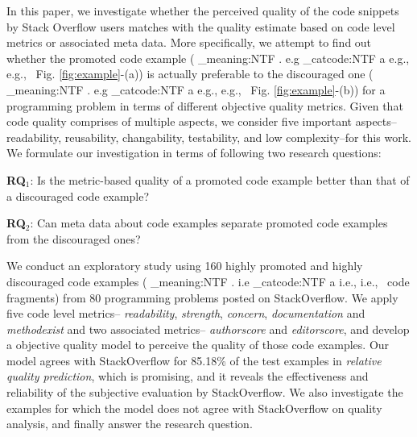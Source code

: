 \documentclass[conference]{IEEEtran}
\makeatletter
\newcommand\latinabbrev[1]{
  \peek_meaning:NTF . {%
    #1\@}%
  { \peek_catcode:NTF a {%
      #1., \@ }%
    {#1., \@}}}
\def\eg{\latinabbrev{e.g}}
\def\ie{\latinabbrev{i.e}}
\makeatother
\begin{document}
In this paper, we investigate whether the perceived quality of the code snippets by Stack Overflow users matches with the quality estimate based on code level metrics or associated meta data.
More specifically, we attempt to find out whether the promoted code example (\eg\ Fig. \ref{fig:example}-(a)) is actually preferable to the discouraged one (\eg\ Fig. \ref{fig:example}-(b)) for a programming problem in terms of different objective quality metrics. Given that code quality comprises of multiple aspects, we consider five important aspects--readability, reusability, changability, testability, and low complexity--for this work. We formulate our investigation in terms of following two research questions:
\begin{framed}
\noindent
\textbf{RQ$_1$}: Is the metric-based quality of a promoted code example better than that of a discouraged code example?

\noindent
\textbf{RQ$_2$}: Can meta data about code examples separate promoted code examples from the discouraged ones?

\end{framed}
We conduct an exploratory study using 160 highly promoted and highly discouraged code examples (\ie\ code fragments) from 80 programming problems posted on StackOverflow. We apply five code level metrics-- \emph{readability}, \emph{strength}, \emph{concern}, \emph{documentation} and \emph{methodexist} and two associated metrics-- \emph{authorscore} and \emph{editorscore}, and develop a objective quality model to perceive the quality of those code examples.  Our model agrees with StackOverflow for 85.18\% of the test examples in \emph{relative quality prediction}, which is promising, and it reveals the effectiveness and reliability of the subjective evaluation by StackOverflow. We also investigate the examples for which the model does not agree with StackOverflow on quality analysis, and finally answer the research question.
\end{document}
